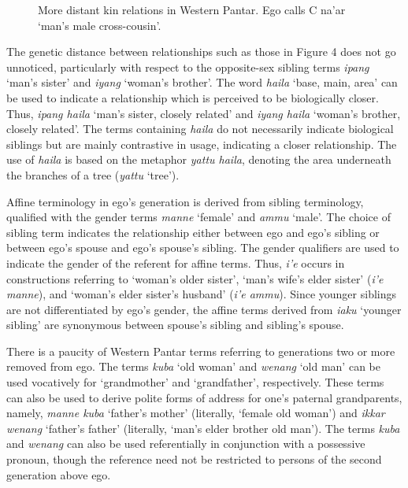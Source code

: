 \begin{figure}

\caption{More distant kin relations in Western Pantar. Ego calls C na'ar `man's male cross-cousin'.}
\end{figure}

The genetic distance between relationships such as those in Figure 4 does not go unnoticed, particularly with respect to the opposite-sex sibling terms \textit{ipang} `man's sister' and \textit{iyang} `woman's brother'. The word \textit{haila} `base, main, area' can be used to indicate a relationship which is perceived to be biologically closer. Thus, \textit{ipang haila} `man's sister, closely related' and \textit{iyang haila} `woman's brother, closely related'. The terms containing \textit{haila} do not necessarily indicate biological siblings but are mainly contrastive in usage, indicating a closer relationship. The use of \textit{haila} is based on the metaphor \textit{yattu haila}, denoting the area underneath the branches of a tree (\textit{yattu} `tree').

Affine terminology in ego's generation is derived from sibling terminology, qualified with the gender terms \textit{manne} `female' and \textit{ammu} `male'. The choice of sibling term indicates the relationship either between ego and ego's sibling or between ego's spouse and ego's spouse's sibling. The gender qualifiers are used to indicate the gender of the referent for affine terms. Thus, \textit{i'e} occurs in constructions referring to `woman's older sister', `man's wife's elder sister' (\textit{i'e manne}), and `woman's elder sister's husband' (\textit{i'e ammu}). Since younger siblings are not differentiated by ego's gender, the affine terms derived from \textit{iaku} `younger sibling' are synonymous between spouse's sibling and sibling's spouse.

There is a paucity of Western Pantar terms referring to generations two or more removed from ego. The terms \textit{kuba} `old woman' and \textit{wenang} `old man' can be used vocatively for `grandmother' and `grandfather', respectively. These terms can also be used to derive polite forms of address for one's paternal grandparents, namely, \textit{manne kuba} `father's mother' (literally, `female old woman') and \textit{ikkar wenang} `father's father' (literally, `man's elder brother old man'). The terms \textit{kuba} and \textit{wenang} can also be used referentially in conjunction with a possessive pronoun, though the reference need not be restricted to persons of the second generation above ego.






